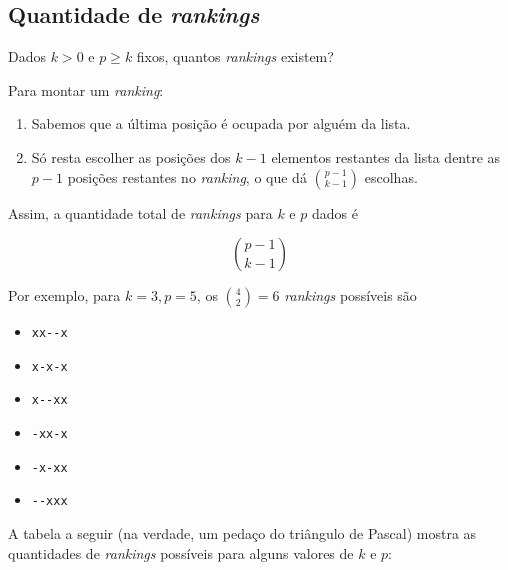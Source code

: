 \documentclass[
  letterpaper,
  DIV=11,
  numbers=noendperiod]{scrreprt}
\providecommand{\tightlist}{%
  \setlength{\itemsep}{0pt}\setlength{\parskip}{0pt}}\usepackage{longtable,booktabs,array}
\begin{document}
\subsection{\texorpdfstring{Quantidade de
\emph{rankings}}{Quantidade de rankings}}\label{quantidade-de-rankings}

Dados $k > 0$ e $p \geq k$ fixos, quantos \emph{rankings} existem?

Para montar um \emph{ranking}:

\begin{enumerate}
\def\labelenumi{\arabic{enumi}.}
\item
  Sabemos que a última posição é ocupada por alguém da lista.
\item
  Só resta escolher as posições dos $k - 1$ elementos restantes da lista
  dentre as $p - 1$ posições restantes no \emph{ranking}, o que dá
  $\binom{p - 1}{k - 1}$ escolhas.
\end{enumerate}

Assim, a quantidade total de \emph{rankings} para $k$ e $p$ dados é

\[
\binom{p - 1}{k - 1}
\]

Por exemplo, para $k = 3, p = 5$, os $\binom{4}{2} = 6$ \emph{rankings}
possíveis são

\begin{itemize}
\tightlist
\item
  \texttt{xx-\/-x}
\item
  \texttt{x-x-x}
\item
  \texttt{x-\/-xx}
\item
  \texttt{-xx-x}
\item
  \texttt{-x-xx}
\item
  \texttt{-\/-xxx}
\end{itemize}

A tabela a seguir (na verdade, um pedaço do triângulo de Pascal) mostra
as quantidades de \emph{rankings} possíveis para alguns valores de $k$ e
$p$:
\end{document}
